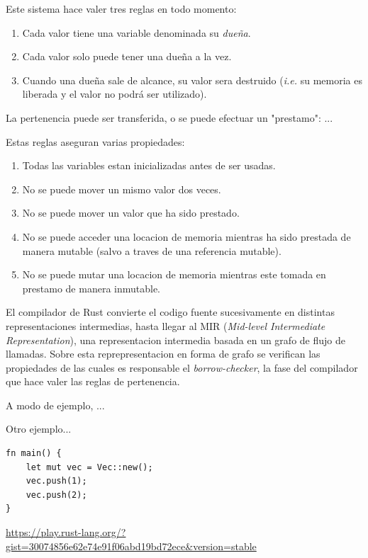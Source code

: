 \documentclass[12pt, a4paper]{article}
\begin{document}
Este sistema hace valer tres reglas en todo momento: 

\begin{enumerate}
\item Cada valor tiene una variable denominada su \textit{dueña}.
\item Cada valor solo puede tener una dueña a la vez.
\item Cuando una dueña sale de alcance, su valor sera destruido (\textit{i.e.} su memoria es liberada y el valor no podrá ser utilizado).
\end{enumerate}

La pertenencia puede ser transferida, o se puede efectuar un "prestamo": ...

Estas reglas aseguran varias propiedades:

\begin{enumerate}
\item Todas las variables estan inicializadas antes de ser usadas. 
\item No se puede mover un mismo valor dos veces.
\item No se puede mover un valor que ha sido prestado.
\item No se puede acceder una locacion de memoria mientras ha sido prestada de manera mutable (salvo a traves de una referencia mutable).
\item No se puede mutar una locacion de memoria mientras este tomada en prestamo de manera inmutable. 
\end{enumerate}

El compilador de Rust convierte el codigo fuente sucesivamente en distintas representaciones intermedias, hasta llegar al MIR (\textit{Mid-level Intermediate Representation}), una representacion intermedia basada en un grafo de flujo de llamadas. 
Sobre esta reprepresentacion en forma de grafo se verifican las propiedades de las cuales es responsable el \textit{borrow-checker}, la fase del compilador que hace valer las reglas de pertenencia.

A modo de ejemplo, ...


Otro ejemplo...

\begin{verbatim}
fn main() {
    let mut vec = Vec::new();
    vec.push(1);
    vec.push(2);
}
\end{verbatim}

\url{https://play.rust-lang.org/?gist=30074856e62e74e91f06abd19bd72ece&version=stable}
\end{document}
